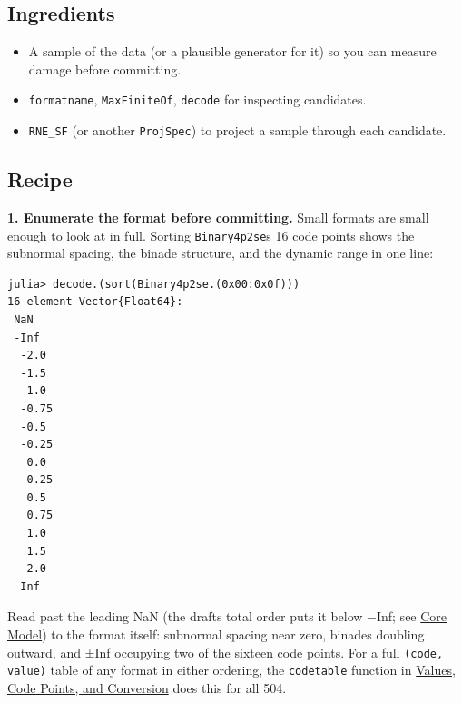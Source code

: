\subsection{Ingredients}



\label{13776634711169142479}{}


\begin{itemize}
\item A sample of the data (or a plausible generator for it) so you can measure damage before committing.


\item \texttt{formatname}, \texttt{MaxFiniteOf}, \texttt{decode} for inspecting candidates.


\item \texttt{RNE\_\allowbreak{}SF} (or another \texttt{ProjSpec}) to project a sample through each candidate.

\end{itemize}


\subsection{Recipe}



\label{111379208343275940}{}


\textbf{1. Enumerate the format before committing.} Small formats are small enough to look at in full. Sorting \texttt{Binary4p2se}{\textquotesingle}s 16 code points shows the subnormal spacing, the binade structure, and the dynamic range in one line:




\nopagebreak[4]
\begin{verbatim}
julia> decode.(sort(Binary4p2se.(0x00:0x0f)))
16-element Vector{Float64}:
 NaN
 -Inf
  -2.0
  -1.5
  -1.0
  -0.75
  -0.5
  -0.25
   0.0
   0.25
   0.5
   0.75
   1.0
   1.5
   2.0
  Inf
\end{verbatim}



Read past the leading NaN (the draft{\textquotesingle}s total order puts it below −Inf; see \href{core\_\allowbreak{}model.md}{Core Model}) to the format itself: subnormal spacing near zero, binades doubling outward, and ±Inf occupying two of the sixteen code points. For a full \texttt{(code, value)} table of any format in either ordering, the \texttt{codetable} function in \href{concept\_\allowbreak{}values\_\allowbreak{}codepoints.md}{Values, Code Points, and Conversion} does this for all 504.



